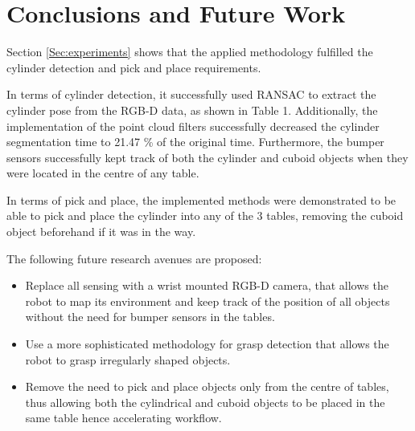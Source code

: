 \section{Conclusions and Future Work}\label{Sec:conclusions}
Section \ref{Sec:experiments} shows that the applied methodology fulfilled the cylinder detection and pick and place requirements. 

In terms of cylinder detection, it successfully used RANSAC to extract the cylinder pose from the RGB-D data, as shown in Table 1. Additionally, the implementation of the point cloud filters successfully decreased the cylinder segmentation time to 21.47 \% of the original time. Furthermore, the bumper sensors successfully kept track of both the cylinder and cuboid objects when they were located in the centre of any table.

In terms of pick and place, the implemented methods were demonstrated to be able to pick and place the cylinder into any of the 3 tables, removing the cuboid object beforehand if it was in the way.

The following future research avenues are proposed:

\begin{itemize}
    \item Replace all sensing with a wrist mounted RGB-D camera, that allows the robot to map its environment and keep track of the position of all objects without the need for bumper sensors in the tables.
    
    \item Use a more sophisticated methodology for grasp detection that allows the robot to grasp irregularly shaped objects.
    
    \item Remove the need to pick and place objects only from the centre of tables, thus allowing both the cylindrical and cuboid objects to be placed in the same table hence accelerating workflow.
    
\end{itemize}